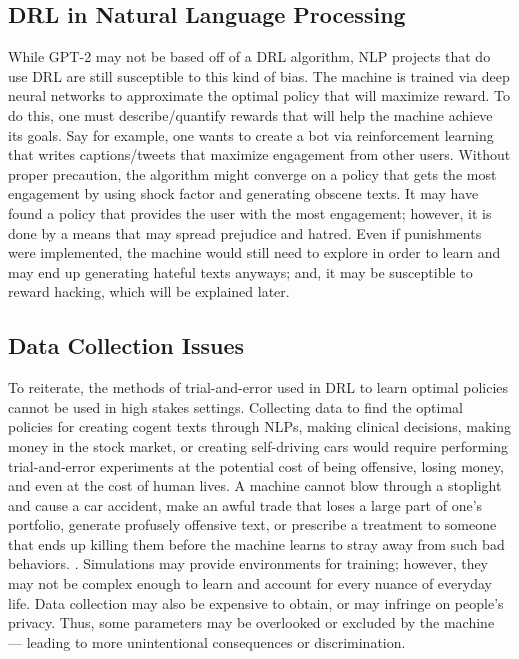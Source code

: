 \documentclass[10pt,twocolumn]{article}
\begin{document}
\subsection{DRL in Natural Language Processing}
While GPT-2 may not be based off of a DRL algorithm, NLP projects that do use DRL are still susceptible to this kind of bias. The machine is trained via deep neural networks to approximate the optimal policy that will maximize reward. To do this, one must describe/quantify rewards that will help the machine achieve its goals. Say for example, one wants to create a bot via reinforcement learning that writes captions/tweets that maximize engagement from other users. Without proper precaution, the algorithm might converge on a policy that gets the most engagement by using shock factor and generating obscene texts. It may have found a policy that provides the user with the most engagement; however, it is done by a means that may spread prejudice and hatred. Even if punishments were implemented, the machine would still need to explore in order to learn and may end up generating hateful texts anyways; and, it may be susceptible to reward hacking, which will be explained later.

\subsection{Data Collection Issues}

To reiterate, the methods of trial-and-error used in DRL to learn optimal policies cannot be used in high stakes settings. Collecting data to find the optimal policies for creating cogent texts through NLPs, making clinical decisions, making money in the stock market, or creating self-driving cars would require performing trial-and-error experiments at the potential cost of being offensive, losing money, and even at the cost of human lives. A machine cannot blow through a stoplight and cause a car accident, make an awful trade that loses a large part of one's portfolio, generate profusely offensive text, or prescribe a treatment to someone that ends up killing them before the machine learns to stray away from such bad behaviors. \cite{10.1613/jair.1.12360}. Simulations may provide environments for training; however, they may not be complex enough to learn and account for every nuance of everyday life. Data collection may also be expensive to obtain, or may infringe on people's privacy. Thus, some parameters may be overlooked or excluded by the machine — leading to more unintentional consequences or discrimination. 
\end{document}

